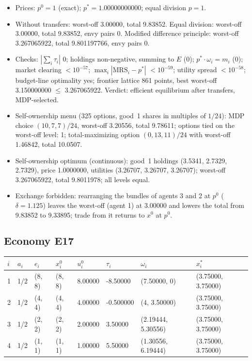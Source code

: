 \begin{itemize}[leftmargin=1.2em,itemsep=0pt,topsep=2pt]\footnotesize
\item Prices: $p^0 = 1$ (exact); $p^* = 1.00000000000$; equal division $p = 1$.
\item Without transfers: worst-off 3.00000, total 9.83852. Equal division: worst-off 3.00000, total 9.83852, envy pairs 0. Modified difference principle: worst-off 3.267065922, total 9.801197766, envy pairs 0.
\item Checks: $|\sum_i\tau_i|$ 0; holdings non-negative, summing to $E$ (0); $p^*\cdot\omega_i = m_i$ (0); market clearing $<10^{-57}$; $\max_i|\mathrm{MRS}_i - p^*|$ $<10^{-59}$; utility spread $<10^{-58}$; budget-line optimality yes; frontier lattice 861 points, best worst-off 3.150000000 $\leq$ 3.267065922. Verdict: efficient equilibrium after transfers, MDP-selected.
\item Self-ownership menu (325 options, good~1 shares in multiples of $1/24$): MDP choice $(10, 7, 7)/24$, worst-off 3.20556, total 9.78611; options tied on the worst-off level: 1; total-maximizing option $(0, 13, 11)/24$ with worst-off 1.46842, total 10.0507.
\item Self-ownership optimum (continuous): good~1 holdings (3.5341, 2.7329, 2.7329), price 1.0000000, utilities (3.26707, 3.26707, 3.26707); worst-off 3.267065922, total 9.8011978; all levels equal.
\item Exchange forbidden: rearranging the bundles of agents 3 and 2 at $p^0$ ($\delta = 1.125$) leaves the worst-off (agent 1) at 3.00000 and lowers the total from 9.83852 to 9.33895; trade from it returns to $x^0$ at $p^0$.
\end{itemize}

\subsection*{Economy E17}
\label{ec:E17}
{\scriptsize\setlength{\tabcolsep}{3pt}
\begin{tabular}{@{}llllllll@{}}
\toprule
$i$ & $a_i$ & $e_i$ & $x^0_i$ & $u^0_i$ & $\tau_i$ & $\omega_i$ & $x^*_i$ \\
\midrule
1 & 1/2 & (8, 8) & (8, 8) & 8.00000 & -8.50000 & (7.50000, 0) & (3.75000, 3.75000) \\
2 & 1/2 & (4, 4) & (4, 4) & 4.00000 & -0.500000 & (4, 3.50000) & (3.75000, 3.75000) \\
3 & 1/2 & (2, 2) & (2, 2) & 2.00000 & 3.50000 & (2.19444, 5.30556) & (3.75000, 3.75000) \\
4 & 1/2 & (1, 1) & (1, 1) & 1.00000 & 5.50000 & (1.30556, 6.19444) & (3.75000, 3.75000) \\
\bottomrule\end{tabular}}

